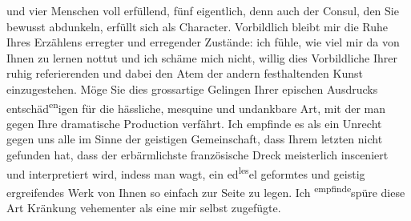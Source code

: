                und vier Menschen voll erfüllend, fünf eigentlich, denn auch der Consul, den Sie bewusst abdunkeln, erfüllt
               sich als Character. Vorbildlich bleibt mir die Ruhe Ihres Erzählens erregter und
               erregender Zustände: ich fühle, wie viel mir da von Ihnen zu lernen nottut und ich
               schäme mich nicht, willig dies Vorbildliche Ihrer ruhig referierenden und dabei den
               Atem der andern festhaltenden Kunst einzugestehen. Möge Sie {\pb}dies grossartige Gelingen Ihrer epischen
               Ausdrucks entschäd\substVorne{}\textsuperscript{en}\substDazwischen{}igen\substHinten{} für die hässliche, mesquine und undankbare Art, mit der man gegen Ihre
               dramatische Production verfährt. Ich empfinde es als ein Unrecht gegen uns alle im
               Sinne der geistigen Gemeinschaft, dass Ihrem letzten \label{K_L03674-3v}\label{K_L03674-3} nicht gefunden hat, dass der
               erbärmlichste französische Dreck meisterlich insceniert und interpretiert wird,
               indess man wagt, ein ed\substVorne{}\textsuperscript{les}\substDazwischen{}el\substHinten{} geformtes und geistig ergreifendes Werk von Ihnen so einfach zur Seite zu
               legen. Ich \substVorne{}\textsuperscript{empfinde}\substDazwischen{}spüre\substHinten{} diese Art Kränkung vehementer als eine mir selbst zugefügte.\pend
           
